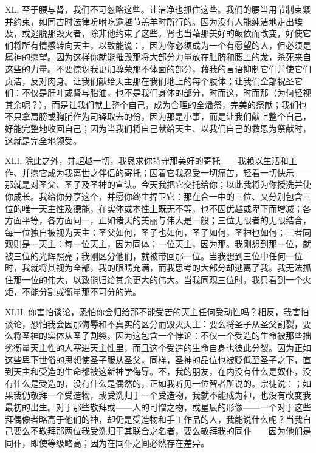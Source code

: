 XL. 至于腰与肾，我们不可忽略这些。让洁净也抓住这些。我们的腰当用节制束紧并约束，如同古时法律吩咐吃逾越节羔羊时所行的。因为没有人能纯洁地走出埃及，或逃脱那毁灭者，除非他约束了这些。肾也当藉那美好的皈依而改变，好使它们将所有情感转向天主，以致能说：，因为你必须成为一个有愿望的人，但必须是属神的愿望。因为这样你就能摧毁那将大部分力量放在肚脐和腰上的龙，杀死来自这些的力量。不要惊讶我更加尊荣那不体面的部分，藉我的言语抑制它们并使它们贞洁，反对肉身。让我们献给天主那在我们地上的每个肢体；让我们全部祝圣它们：不仅是肝叶或肾与脂油，也不是我们身体的部分，时而这，时而那（为何轻视其余呢？），而是让我们献上整个自己，成为合理的全燔祭，完美的祭献；我们也不只拿肩膀或胸脯作为司铎取去的份，因为那是小事，而是让我们献上整个自己，好能完整地收回自己；因为当我们将自己献给天主、以我们自己的救恩为祭献时，这就是完全地领受。\par

XLI. 除此之外，并超越一切，我恳求你持守那美好的寄托——我赖以生活和工作、并愿它成为我离世之伴侣的寄托；因着它我忍受一切痛苦，轻看一切快乐——那就是对圣父、圣子及圣神的宣认。今天我把它交托给你；以此我将为你授洗并使你成长。我给你分享这个，并愿你终生捍卫它：那在合一中的三位、又分别包含三位的唯一天主性及德能，在实体或本性上既无不等，也不因优越或卑下而增减；各方面平等，各方面同一，正如诸天的美丽与伟大是一般；三位无限者的无限结合，每一位独自被视为天主：圣父如何，圣子也如何，圣子如何，圣神也如何；三者同观则是一天主：每一位天主，因为同体；一位天主，因为那。我刚想到那一位，就被三位的光辉照亮；我刚区分他们，就被带回那一位。当我想到三位中任何一位时，我就将其视为全部，我的眼睛充满，而我思考的大部分却逃离了我。我无法抓住那一位的伟大，以致能归给其余更大的伟大。当我同观三位时，我只看到一个火炬，不能分割或衡量那不可分的光。\par

XLII. 你害怕谈论，恐怕你会归给那不能受苦的天主任何受动性吗？相反，我害怕谈论，恐怕我会因那侮辱和不真实的区分而毁灭天主：要么将圣子从圣父割裂，要么将圣神的实体从圣子割裂。因为这包含一个悖论：不仅一个受造的生命被那些拙劣衡量天主性的人塞进天主性里，而且这个受造的生命自身也彼此分裂。因为正如这些卑下世俗的思想使圣子服从圣父，同样，圣神的品位也被贬低至圣子之下，直到天主和受造的生命都被这新神学侮辱。不，我的朋友，在内没有什么是奴仆，没有什么是受造的，没有什么是偶然的，正如我听见一位智者所说的。宗徒说：；如果我仍敬拜一个受造物，或受洗归于一个受造物，我就不能成为神，也没有改变我最初的出生。对于那些敬拜或——人的可憎之物，或星辰的形像——一个对于这些拜偶像者略高于他们的神，却仍是受造物和手工作品的人，我能说什么呢？当我自己要么不敬拜那两位我受洗归于其联合之名者，要么敬拜我的同仆——因为他们是同仆，即使等级略高；因为在同仆之间必然存在差异。\par

